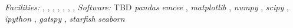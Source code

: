 \documentclass[twocolumn]{emulateapj}%
\newcommand{\project}[1]{\textsl{#1}}
\begin{document}
{\it Facilities:} , , , , , , , 
{\it Software: } TBD
	\project{pandas} \citep{mckinney10}
    \project{emcee} \citep{foreman13},
	\project{matplotlib} \citep{hunter07},
	\project{numpy} \citep{vanderwalt11},
	\project{scipy} \citep{jones01},
	\project{ipython} \citep{perez07},
	\project{gatspy} \citep{JakeVanderplas2015},
	\project{starfish} \citep{czekala15}
	\project{seaborn} \citep{waskom14}

\clearpage



\end{document}
